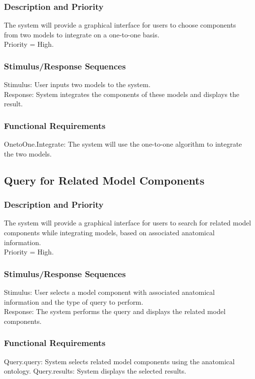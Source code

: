 \documentclass{article}
\begin{document}
\subsubsection{Description and Priority}
The system will provide a graphical interface for users to choose components from two models to integrate on a one-to-one basis.\\
Priority = High.

\subsubsection{Stimulus/Response Sequences}
Stimulus: User inputs two models to the system.\\
Response: System integrates the components of these models and displays the result.

\subsubsection{Functional Requirements}
OnetoOne.Integrate: The system will use the one-to-one algorithm to integrate the two models.

\subsection{Query for Related Model Components}
\subsubsection{Description and Priority}
The system will provide a graphical interface for users to search for related model components while integrating models, based on associated anatomical information.\\
Priority = High.
\subsubsection{Stimulus/Response Sequences}
Stimulus: User selects a model component with associated anatomical information and the type of query to perform.\\
Response: The system performs the query and displays the related model components.
\subsubsection{Functional Requirements}
Query.query: System selects related model components using the anatomical ontology.
Query.results: System displays the selected results.
\end{document}
